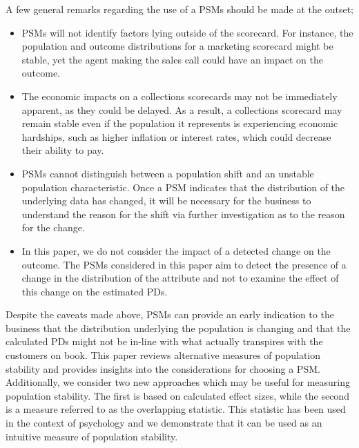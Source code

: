 \documentclass{article}
\theoremstyle{def}
\begin{document}
A few general remarks regarding the use of a PSMs should be made at the outset;
\begin{itemize}
\item PSMs will not identify factors lying outside of the scorecard. For instance, the population and outcome distributions for a marketing scorecard might be stable, yet the agent making the sales call could have an impact on the outcome.
\item The economic impacts on a collections scorecards may not be immediately apparent, as they could be delayed. As a result, a collections scorecard may remain stable even if the population it represents is experiencing economic hardships, such as higher inflation or interest rates, which could decrease their ability to pay. 
\item PSMs cannot distinguish between a population shift and an unstable population characteristic. Once a PSM indicates that the distribution of the underlying data has changed, it will be necessary for the business to understand the reason for the shift via further investigation as to the reason for the change.
\item In this paper, we do not consider the impact of a detected change on the outcome. The PSMs considered in this paper aim to detect the presence of a change in the distribution of the attribute and not to examine the effect of this change on the estimated PDs.
\end{itemize}

Despite the caveats made above, PSMs can provide an early indication to the business that the distribution underlying the population is changing and that the calculated PDs might not be in-line with what actually transpires with the customers on book.
This paper reviews alternative measures of population stability and provides insights into the considerations for choosing a PSM. Additionally, we consider two new approaches which may be useful for measuring population stability. The first is based on calculated effect sizes, while the second is a measure referred to as the overlapping statistic. This statistic has been used in the context of psychology and we demonstrate that it can be used as an intuitive measure of population stability. 
\end{document}
